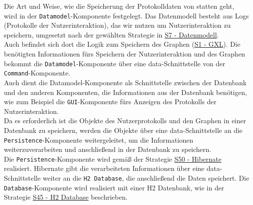 \documentclass[enabledeprecatedfontcommands,fontsize=11pt,paper=a4,twoside]{scrartcl}
\newcounter{one}
\begin{document}
	Die Art und Weise, wie die Speicherung der Protokolldaten von statten geht, wird in der \texttt{Datamodel}-Komponente festgelegt. Das Datenmodell besteht aus Logs (Protokolle der Nutzerinteraktion), das wir nutzen um Nutzerinteraktion zu speichern, umgesetzt nach der gewählten Strategie in \hyperlink{aaa}{S7 - Datenmodell}. \\
	Auch befindet sich dort die Logik zum Speichern des Graphen (\hyperlink{yy}{S1 - GXL}). Die benötigten Informationen fürs Speichern der Nutzerinteraktion und des Graphen bekommt die \texttt{Datamodel}-Komponente über eine data-Schnittstelle von der \texttt{Command}-Komponente. \\
	Auch dient die Datamodel-Komponente als Schnittstelle zwischen der Datenbank und den anderen Komponenten, die Informationen aus der Datenbank benötigen, wie zum Beispiel die \texttt{GUI}-Komponente fürs Anzeigen des Protokolls der Nutzerinteraktion.\\
	Da es erforderlich ist die Objekte des Nutzerprotokolls und den Graphen in einer Datenbank zu speichern, werden die Objekte über eine data-Schnittstelle an die \texttt{Persistence}-Komponente weitergeleitet, um die Informationen weiterzuverarbeiten und anschließend in der Datenbank zu speichern. \\ 
	
	Die \texttt{Persistence}-Komponente wird gemäß der Strategie \hyperlink{rrr}{S50 - Hibernate} realisiert.
	Hibernate gibt die verarbeiteten Informationen über eine data-Schnittstelle weiter an die \texttt{H2 Database}, die anschließend die Daten speichert. Die \texttt{Database}-Komponente wird realisiert mit einer H2 Datenbank, wie in der Strategie \hyperlink{ppp}{S45 - H2 Database} beschrieben.\\ 
	
\end{document}
